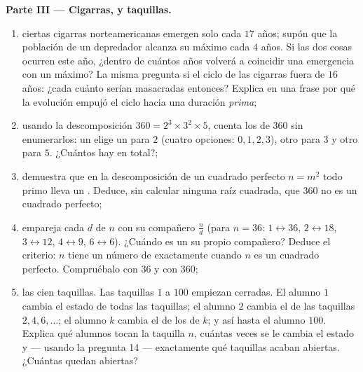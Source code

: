 \begin{problem}
\medskip
\noindent\textbf{Parte III --- Cigarras,  y taquillas.}
\begin{enumerate}[resume]
  \item ciertas cigarras norteamericanas emergen solo cada $17$
        años; supón que la población de un depredador alcanza su máximo cada $4$
        años. Si las dos cosas ocurren este año, ¿dentro de cuántos años
        volverá a coincidir una emergencia con un máximo? La misma pregunta si
        el ciclo de las cigarras fuera de $16$ años: ¿cada cuánto
        serían masacradas entonces? Explica en una frase por qué
        la evolución empujó el ciclo hacia una duración \emph{prima};
  \item usando la descomposición $360 = 2^3 \times 3^2 \times 5$,
        cuenta los  de $360$ sin enumerarlos: un
         elige un  para $2$ (cuatro opciones:
        $0, 1, 2, 3$), otro para $3$ y otro para $5$. ¿Cuántos
         hay en total?;
  \item demuestra que en la descomposición de un cuadrado perfecto
        $n = m^2$ todo primo lleva un  \emph{}.
        Deduce, sin calcular ninguna raíz cuadrada, que $360$ no
        es un cuadrado perfecto;
  \item empareja cada  $d$ de $n$ con su compañero
        $\frac{n}{d}$ (para $n = 36$: $1 \leftrightarrow 36$,
        $2 \leftrightarrow 18$, $3 \leftrightarrow 12$,
        $4 \leftrightarrow 9$, $6 \leftrightarrow 6$). ¿Cuándo es un
         su propio compañero? Deduce el criterio: $n$ tiene un
        número \emph{} de  exactamente cuando $n$ es un
        cuadrado perfecto. Compruébalo con $36$ y con $360$;
  \item las cien taquillas. Las taquillas $1$ a $100$ empiezan cerradas.
        El alumno $1$ cambia el estado de todas las taquillas; el alumno $2$ cambia el de las
        taquillas $2, 4, 6, \dots$; el alumno $k$ cambia el de los
         de $k$; y así hasta el alumno $100$. Explica
        qué alumnos tocan la taquilla $n$, cuántas veces se le
        cambia el estado y --- usando la pregunta 14 --- exactamente qué
        taquillas acaban abiertas. ¿Cuántas quedan abiertas?
\end{enumerate}
\end{problem}

